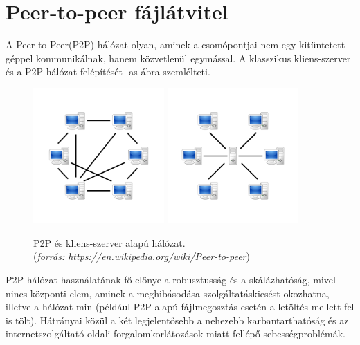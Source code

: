 \section{Peer-to-peer fájlátvitel} 
\label{sect:p2p}
A Peer-to-Peer(P2P) hálózat olyan, aminek a csomópontjai nem egy kitüntetett géppel 
kommunikálnak, hanem közvetlenül egymással. A klasszikus kliens-szerver és a P2P hálózat felépítését
-as ábra szemlélteti.

\begin{figure}[ht]
	\centering
	\includegraphics[width=50mm, keepaspectratio]{figures/P2P-network.png}\hspace{1cm}
	\includegraphics[width=50mm, keepaspectratio]{figures/Server-based-network.png}
	\caption{P2P és kliens-szerver alapú hálózat. \\(\textit{forrás: https://en.wikipedia.org/wiki/Peer-to-peer})}
	\label{fig:networkcomparison}
\end{figure}

P2P hálózat használatának fő előnye a robusztusság és a skálázhatóság, mivel nincs központi elem,
aminek a meghibásodása szolgáltatáskiesést okozhatna, illetve a hálózat min (például P2P alapú fájlmegosztás esetén a letöltés mellett fel is tölt). Hátrányai közül a két legjelentősebb a nehezebb karbantarthatóság és az internetszolgáltató-oldali forgalomkorlátozások miatt fellépő sebességproblémák.

